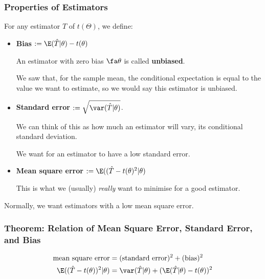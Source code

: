 \documentclass[a4paper]{article}
\begin{document}
            \subsubsection{Properties of Estimators}
                \begin{definition}
                    For any estimator $\hat T$ of $t(\Theta)$, we define:

                    \begin{itemize}
                        \item \textbf{Bias} $:= \E(\hat T | \theta) - t(\theta)$

                            An estimator with zero bias $\fa \theta$ is called
                            \textbf{unbiased}.

                            We saw that, for the sample mean, the conditional
                            expectation is equal to the value we want to
                            estimate, so we would say this estimator is
                            unbiased.

                        \item \textbf{Standard error} $:= \sqrt{\var(\hat T |
                            \theta)}$.

                            We can think of this as how much an estimator will
                            vary, its conditional standard deviation.

                            We want for an estimator to have a low standard
                            error.

                        \item \textbf{Mean square error} $:= \E((\hat T -
                            t(\theta)^2 | \theta)$

                            This is what we (usually) \textit{really} want to
                            minimise for a good estimator.
                    \end{itemize}
                \end{definition}

                Normally, we want estimators with a low mean square error.

            \subsubsection{Theorem: Relation of Mean Square Error, Standard
            Error, and Bias}
                \begin{align*}
                    \text{mean square error} & = (\text{standard error})^2 +
                        (\text{bias})^2 \\
                    \E((\hat T - t(\theta))^2 | \theta) & = \var(\hat T |
                        \theta) + (\E(\hat T | \theta) - t(\theta))^2
                \end{align*}
\end{document}
